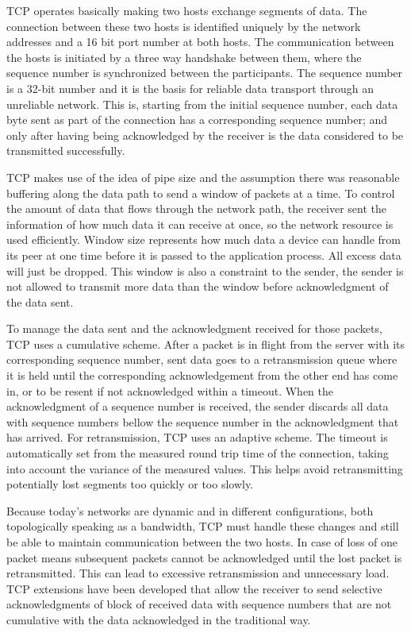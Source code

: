 TCP operates basically making two hosts exchange segments of data. The
connection between these two hosts is identified uniquely by the network addresses and a 16 bit port number at both hosts. The communication between the
hosts is initiated by a three way handshake between them, where the
sequence number is synchronized between the participants. The sequence number
is a 32-bit number and it is the basis for reliable data transport through an unreliable network. This is, starting from the initial sequence
number, each data byte sent as part of the connection has a corresponding
sequence number; and only after having being acknowledged by the receiver is
the data considered to be transmitted successfully.

TCP makes use of the idea of pipe size and the assumption there was reasonable buffering along the data path to send a window of packets at
a time. To control the amount of data that flows through the network path, the
receiver sent the information of how much data it can receive at once, so the
network resource is used efficiently. Window size represents how much data a
device can handle from its peer at one time before it is passed to the
application process. All excess data will just be dropped. This window
is also a constraint to the sender, the sender is not allowed to
transmit more data than the window before acknowledgment of the data sent.

To manage the data sent and the acknowledgment received for those packets, TCP
uses a cumulative scheme. After a packet is in flight from the server with its
corresponding sequence number, sent data goes to a retransmission queue where
it is held until the corresponding acknowledgement from the other end has come in,
or to be resent if not acknowledged within a timeout. When the
acknowledgment of a sequence number is received, the sender discards all data
with sequence numbers bellow the sequence number in the acknowledgment that
has arrived. For retransmission, TCP uses an adaptive scheme. The timeout is
automatically set from the measured round trip time of the connection,
taking into account the variance of the measured values\cite{JacobsonCAC}.
This helps avoid retransmitting potentially lost segments too quickly or too
slowly.

Because today's networks are dynamic and in different configurations, both
topologically speaking as a  bandwidth, TCP must handle these changes and
still be able to maintain communication between the two hosts. In case of
loss of one packet means subsequent packets cannot be acknowledged until the
lost packet is retransmitted. This can lead to excessive retransmission and
unnecessary load. TCP extensions have been developed that allow the receiver to
send selective acknowledgments of block of received data with sequence numbers
that are not cumulative with the data acknowledged in the traditional
way\cite{RFC2018}.

